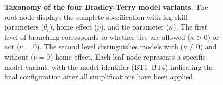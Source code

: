 \begin{figure}[ht]
    \caption{
        \textbf{Taxonomy of the four Bradley-Terry model variants}.
        The root node displays the complete specification with log-skill parameters ($\theta_i$), home effect ($\nu$), and tie parameter ($\kappa$).
        The first level of branching corresponds to whether ties are allowed ($\kappa > 0$) or not ($\kappa = 0$).
        The second level distinguishes models with ($\nu \neq 0$) and without ($\nu = 0$) home effect.
        Each leaf node represents a specific model variant, with the model identifier (BT1--BT4) indicating the final configuration after all simplifications have been applied.
    }
    \label{fig:bt_models_taxonomy}
\end{figure}
